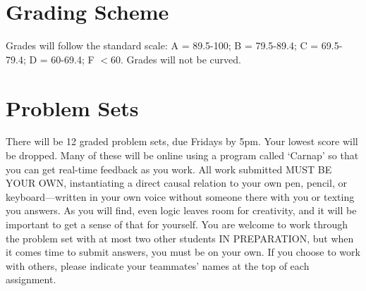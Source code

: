 \documentclass[letterpaper]{inzane_syllabus} %
\begin{document}
\vspace{0.5cm}
\section{Grading Scheme}

\begin{twentyshort}
\end{twentyshort}

Grades will follow the standard scale: A = 89.5-100; B = 79.5-89.4; C = 69.5-79.4; D = 60-69.4; F  $<$60. Grades will not be curved.


\vspace{0.5cm}
\section{Problem Sets}

There will be 12 graded problem sets, due Fridays by 5pm.
Your lowest score will be dropped.
Many of these will be online using a program called ‘Carnap’ so that you can get real-time feedback as you work.
All work submitted MUST BE YOUR OWN, instantiating a direct causal relation to your own pen, pencil, or keyboard—written in your own voice without someone there with you or texting you answers.
As you will find, even logic leaves room for creativity, and it will be important to get a sense of that for yourself.
You are welcome to work through the problem set with at most two other students IN PREPARATION, but when it comes time to submit answers, you must be on your own.
If you choose to work with others, please indicate your teammates’ names at the top of each assignment.

\vspace{0.5cm}
\end{document}
